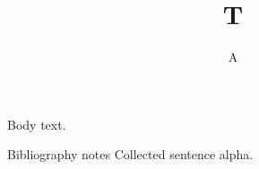 \documentclass{resphilosophica}
\title{T}\author{A}
\begin{document}
\maketitle
Body text.
\begin{notes}{Bibliography notes}
Collected sentence alpha.
\end{notes}
\end{document}
